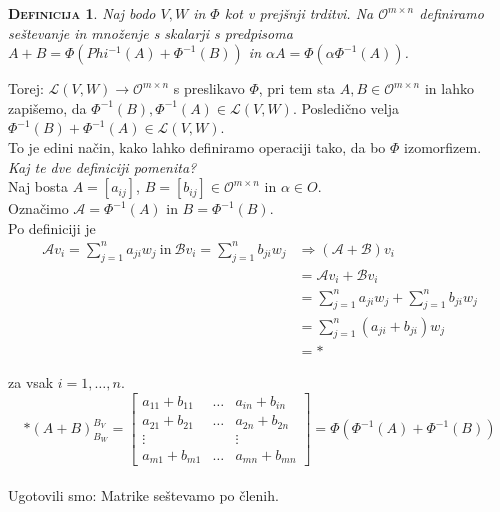 \documentclass[a4paper,12pt]{article}
\newtheorem*{definicija}{\textsc{Definicija}}
\begin{document}
\begin{definicija}
	Naj bodo $V,W$ in $\Phi$ kot v prejšnji trditvi. Na $\mathcal{O}^{m\times n}$ definiramo seštevanje in množenje s skalarji s predpisoma $A+B=\Phi(Phi^{-1}(A)+\Phi^{-1}(B))$ in $\alpha A=\Phi(\alpha \Phi^{-1}(A))$. \\
\end{definicija}

Torej: $\mathcal{L}(V,W) \to \mathcal{O}^{m\times n}$ s preslikavo $\Phi$, pri tem sta $A,B\in \mathcal{O}^{m\times n}$ in lahko zapišemo, da $\Phi^{-1}(B), \Phi^{-1}(A) \in \mathcal{L}(V,W)$. Posledično velja $\Phi^{-1}(B)+\Phi^{-1}(A) \in \mathcal{L}(V,W)$. \\

To je edini način, kako lahko definiramo operaciji tako, da bo $\Phi$ izomorfizem.\\

\textit{Kaj te dve definiciji pomenita?}\\

Naj bosta $A=[a_{ij}]$, $B=[b_{ij}] \in \mathcal{O}^{m\times n}$ in $\alpha \in O$. \\

Označimo $\mathcal{A}=\Phi^{-1}(A)$ in $B=\Phi^{-1}(B)$. \\

Po definiciji je
\begin{align*}
	 \mathcal{A}v_i=\sum_{j=1}^n a_{ji}w_j~\text{in}~\mathcal{B}v_i=\sum_{j=1}^n b_{ji}w_j &\Rightarrow (\mathcal{A}+\mathcal{B})v_i \\
	 &=\mathcal{A}v_i + \mathcal{B}v_i \\
	 &= \sum_{j=1}^n a_{ji}w_j + \sum_{j=1}^n
b_{ji}w_j \\
	&= \sum_{j=1}^n(a_{ji}+b_{ji})w_j \\
	&= *
\end{align*}

za vsak $i=1,\ldots,n$. \\

$$* (A+B)^{B_V}_{B_W}=
\begin{bmatrix}
	a_{11}+b_{11}&\ldots&a_{in}+b_{in} \\
	a_{21}+b_{21}&\ldots&a_{2n}+b_{2n} \\
	\vdots&~&\vdots \\
	a_{m1}+b_{m1}&\ldots&a_{mn}+b_{mn}
\end{bmatrix} 
= \Phi(\Phi^{-1}(A)+\Phi^{-1}(B))$$ \\

Ugotovili smo: Matrike seštevamo po členih. \\
\end{document}
